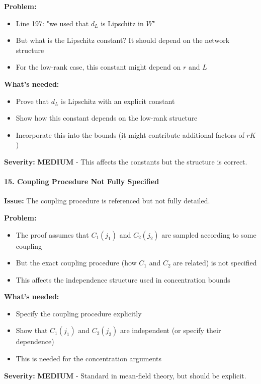 \textbf{Problem:}
\begin{itemize}
\item Line 197: "we used that $d_L$ is Lipschitz in $W$"
\item But what is the Lipschitz constant? It should depend on the network structure
\item For the low-rank case, this constant might depend on $r$ and $L$
\end{itemize}

\textbf{What's needed:}
\begin{itemize}
\item Prove that $d_L$ is Lipschitz with an explicit constant
\item Show how this constant depends on the low-rank structure
\item Incorporate this into the bounds (it might contribute additional factors of $rK$)
\end{itemize}

\textbf{Severity:} \textbf{MEDIUM} - This affects the constants but the structure is correct.

\paragraph*{15. Coupling Procedure Not Fully Specified}

\textbf{Issue:} The coupling procedure is referenced but not fully detailed.

\textbf{Problem:}
\begin{itemize}
\item The proof assumes that $C_1(j_1)$ and $C_2(j_2)$ are sampled according to some coupling
\item But the exact coupling procedure (how $C_1$ and $C_2$ are related) is not specified
\item This affects the independence structure used in concentration bounds
\end{itemize}

\textbf{What's needed:}
\begin{itemize}
\item Specify the coupling procedure explicitly
\item Show that $C_1(j_1)$ and $C_2(j_2)$ are independent (or specify their dependence)
\item This is needed for the concentration arguments
\end{itemize}

\textbf{Severity:} \textbf{MEDIUM} - Standard in mean-field theory, but should be explicit.

